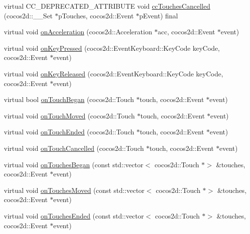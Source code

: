 \begin{DoxyCompactItemize}
\item 
virtual C\+C\+\_\+\+D\+E\+P\+R\+E\+C\+A\+T\+E\+D\+\_\+\+A\+T\+T\+R\+I\+B\+U\+TE void \hyperlink{classcocostudio_1_1InputDelegate_a2c2a17c1eebd305407bdb6c41372a78f}{cc\+Touches\+Cancelled} (cocos2d\+::\+\_\+\+\_\+\+Set $\ast$p\+Touches, cocos2d\+::\+Event $\ast$p\+Event) final
\item 
virtual void \hyperlink{classcocostudio_1_1InputDelegate_a0c34fc919cbe1bb4f7dd7d9ccc80ee87}{on\+Acceleration} (cocos2d\+::\+Acceleration $\ast$acc, cocos2d\+::\+Event $\ast$event)
\item 
virtual void \hyperlink{classcocostudio_1_1InputDelegate_a9b4e79786091fa21bcba335cb737487f}{on\+Key\+Pressed} (cocos2d\+::\+Event\+Keyboard\+::\+Key\+Code key\+Code, cocos2d\+::\+Event $\ast$event)
\item 
virtual void \hyperlink{classcocostudio_1_1InputDelegate_a0bbe5cb845ca74bbef5b47bbe7368228}{on\+Key\+Released} (cocos2d\+::\+Event\+Keyboard\+::\+Key\+Code key\+Code, cocos2d\+::\+Event $\ast$event)
\item 
virtual bool \hyperlink{classcocostudio_1_1InputDelegate_afe6eee9c2022a94a86e1261f6b751a8c}{on\+Touch\+Began} (cocos2d\+::\+Touch $\ast$touch, cocos2d\+::\+Event $\ast$event)
\item 
virtual void \hyperlink{classcocostudio_1_1InputDelegate_adc37729914cd05f43538d18ee14abfce}{on\+Touch\+Moved} (cocos2d\+::\+Touch $\ast$touch, cocos2d\+::\+Event $\ast$event)
\item 
virtual void \hyperlink{classcocostudio_1_1InputDelegate_a645cfb7944ef4878e6de5904d48bf310}{on\+Touch\+Ended} (cocos2d\+::\+Touch $\ast$touch, cocos2d\+::\+Event $\ast$event)
\item 
virtual void \hyperlink{classcocostudio_1_1InputDelegate_aa82e9e391c01c1349f5e7c7d0745b6b5}{on\+Touch\+Cancelled} (cocos2d\+::\+Touch $\ast$touch, cocos2d\+::\+Event $\ast$event)
\item 
virtual void \hyperlink{classcocostudio_1_1InputDelegate_a213fa0908e0b5d7f3164e962fe8e87dc}{on\+Touches\+Began} (const std\+::vector$<$ cocos2d\+::\+Touch $\ast$$>$ \&touches, cocos2d\+::\+Event $\ast$event)
\item 
virtual void \hyperlink{classcocostudio_1_1InputDelegate_ad81bf5704d33542be199908c064f6a3e}{on\+Touches\+Moved} (const std\+::vector$<$ cocos2d\+::\+Touch $\ast$$>$ \&touches, cocos2d\+::\+Event $\ast$event)
\item 
virtual void \hyperlink{classcocostudio_1_1InputDelegate_a164a9ec9e876eb6d9a7121c50ba85d0e}{on\+Touches\+Ended} (const std\+::vector$<$ cocos2d\+::\+Touch $\ast$$>$ \&touches, cocos2d\+::\+Event $\ast$event)
$$
\end{DoxyCompactItemize}
